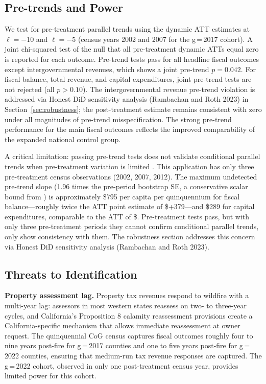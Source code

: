\documentclass[12pt]{article}
\begin{document}
\subsection{Pre-trends and Power}
\label{sec:pretrends}

We test for pre-treatment parallel trends using the dynamic ATT estimates at
$\ell = -10$ and $\ell = -5$ (census years 2002 and 2007 for the g\,=\,2017 cohort).
A joint chi-squared test of the null that all pre-treatment dynamic ATTs equal
zero is reported for each outcome. Pre-trend tests pass for all headline fiscal outcomes except intergovernmental
revenues, which shows a joint pre-trend $p = 0.042$. For fiscal balance, total
revenue, and capital expenditures, joint pre-trend tests are not rejected
(all $p > 0.10$). The intergovernmental revenue pre-trend violation is addressed
via Honest DiD sensitivity analysis (Rambachan and Roth 2023) in
Section~\ref{sec:robustness}; the post-treatment estimate remains consistent with
zero under all magnitudes of pre-trend misspecification. The strong pre-trend
performance for the main fiscal outcomes reflects the improved comparability of the
expanded national control group.

A critical limitation: passing pre-trend tests does not validate conditional parallel
trends when pre-treatment variation is limited \citep{roth2022}. This application
has only three pre-treatment census observations (2002, 2007, 2012). The maximum
undetected pre-trend slope (1.96 times the pre-period bootstrap SE, a conservative
scalar bound from \citealt{roth2022}) is approximately \$795 per capita per
quinquennium for fiscal balance---roughly twice the ATT point estimate of \$+379---and
\$289 for capital expenditures, comparable to the ATT of \$. Pre-treatment
tests pass, but with only three pre-treatment periods they cannot confirm conditional
parallel trends, only show consistency with them.
The robustness section addresses this concern via Honest DiD sensitivity analysis
(Rambachan and Roth 2023).

\subsection{Threats to Identification}

\textbf{Property assessment lag.} Property tax revenues respond to wildfire with a
multi-year lag: assessors in most western states reassess on two- to three-year
cycles, and California's Proposition 8 calamity reassessment provisions create
a California-specific mechanism that allows immediate reassessment at owner request.
The quinquennial CoG census captures fiscal outcomes roughly four to nine years
post-fire for g\,=\,2017 counties and one to five years post-fire for g\,=\,2022
counties, ensuring that medium-run tax revenue responses are captured. The
g\,=\,2022 cohort, observed in only one post-treatment census year, provides
limited power for this cohort.
\end{document}
